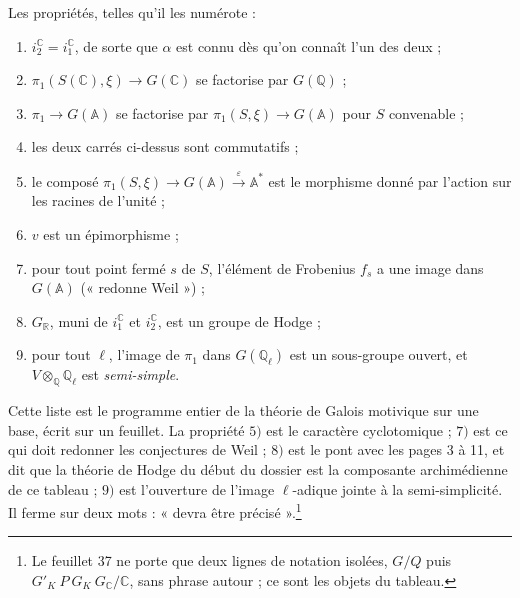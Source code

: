 \documentclass[11pt,a4paper]{article}
\begin{document}


Les propriétés, telles qu'il les numérote :

\begin{enumerate}
  \item[$1)$] $i^{\mathbb{C}}_{2} = i^{\mathbb{C}}_{1}$, de sorte que $\alpha$
  est connu dès qu'on connaît l'un des deux ;
  \item[$2)$] $\pi_{1}(S(\mathbb{C}), \xi) \to G(\mathbb{C})$ se factorise par
  $G(\mathbb{Q})$ ;
  \item[$3)$] $\pi_{1} \to G(\mathbb{A})$ se factorise par
  $\pi_{1}(S, \xi) \to G(\mathbb{A})$ pour $S$ convenable ;
  \item[$4)$] les deux carrés ci-dessus sont commutatifs ;
  \item[$5)$] le composé $\pi_{1}(S, \xi) \to G(\mathbb{A})
  \xrightarrow{\ \varepsilon\ } \mathbb{A}^{*}$ est le morphisme donné par
  l'action sur les racines de l'unité ;
  \item[$6)$] $v$ est un épimorphisme ;
  \item[$7)$] pour tout point fermé $s$ de $S$, l'élément de Frobenius $f_{s}$
  a une image dans $G(\mathbb{A})$ (« redonne Weil ») ;
  \item[$8)$] $G_{\mathbb{R}}$, muni de $i^{\mathbb{C}}_{1}$ et
  $i^{\mathbb{C}}_{2}$, est un groupe de Hodge ;
  \item[$9)$] pour tout $\ell$, l'image de $\pi_{1}$ dans $G(\mathbb{Q}_{\ell})$
  est un sous-groupe ouvert, et $V \otimes_{\mathbb{Q}} \mathbb{Q}_{\ell}$ est
  \emph{semi-simple}.
\end{enumerate}

Cette liste est le programme entier de la théorie de Galois motivique sur une
base, écrit sur un feuillet. La propriété $5)$ est le caractère cyclotomique ;
$7)$ est ce qui doit redonner les conjectures de Weil ; $8)$ est le pont avec
les pages 3 à 11, et dit que la théorie de Hodge du début du dossier est la
composante archimédienne de ce tableau ; $9)$ est l'ouverture de l'image
$\ell$-adique jointe à la semi-simplicité. Il ferme sur deux mots :
« devra être précisé ».\footnote{Le feuillet 37 ne porte que deux lignes de
notation isolées, $G/Q$ puis $G'_{K}\ P\ G_{K}\ G_{\mathbb{C}}/\mathbb{C}$,
sans phrase autour ; ce sont les objets du tableau.}
\end{document}
